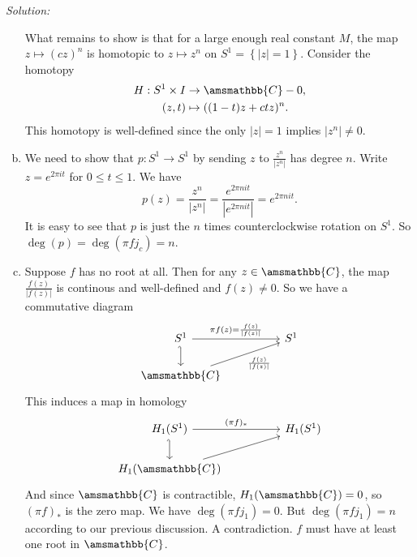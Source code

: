 \documentclass[a4paper, 12pt]{article}
\newenvironment{solution}
    {\textit{Solution:}}
    {}
\renewcommand{\mathbb}{\amsmathbb}
\begin{document}
\begin{solution}
\begin{enumerate}[(a)]
What remains to show is that for a large enough real constant \(M\), the map \(z\mapsto (cz)^n\) is homotopic to \(z\mapsto z^n\) on \(S^1=\left\{ |z|=1 \right\}\). Consider the homotopy 
\begin{align*}
	H:S^1\times I&\rightarrow \mathbb{C}-0,\\ 
	 (z,t)&\mapsto ((1-t)z+ctz)^n.
\end{align*}
This homotopy is well-defined since the only \(|z|=1\) implies \(|z^n|\neq 0\).
\item We need to show that \(p:S^1\rightarrow S^1\) by sending \(z\) to \(\frac{z^n}{|z^n|}\) has degree \(n\). Write \(z=e^{2\pi it}\) for \(0\leq t\leq 1\). We have 
\[p(z)=\frac{z^n}{|z^n|}=\frac{e^{2\pi nit}}{|e^{2\pi nit}|}=e^{2\pi nit}.\]
It is easy to see that \(p\) is just the \(n\) times counterclockwise rotation on \(S^1\). So \(\deg (p)=\deg (\pi fj_c)=n\).
\item Suppose \(f\) has no root at all. Then for any \(z\in \mathbb{C}\), the map \(\frac{f(z)}{|f(z)|}\) is continous and well-defined and \(f(z)\neq 0\). So we have a commutative diagram 
\[\begin{tikzcd}
	{S^1} && {S^1} \\
	{\mathbb{C}}
	\arrow["{\pi f(z)=\frac{f(z)}{|f(z)|}}", from=1-1, to=1-3]
	\arrow[hook', from=1-1, to=2-1]
	\arrow["{\frac{f(z)}{|f(z)|}}"', from=2-1, to=1-3]
\end{tikzcd}\]
This induces a map in homology 
\[\begin{tikzcd}
	{H_1(S^1)} && {H_1(S^1)} \\
	{H_1(\mathbb{C})}
	\arrow["{(\pi f)_*}", from=1-1, to=1-3]
	\arrow[hook', from=1-1, to=2-1]
	\arrow[from=2-1, to=1-3]
\end{tikzcd}\]
And since \(\mathbb{C}\) is contractible, \(H_1(\mathbb{C})=0\), so \((\pi f)_*\) is the zero map. We have \(\deg(\pi fj_1)=0\). But \(\deg(\pi fj_1)=n\) according to our previous discussion. A contradiction. \(f\) must 
have at least one root in \(\mathbb{C}\).
\end{enumerate}
\end{solution}
\end{document}
